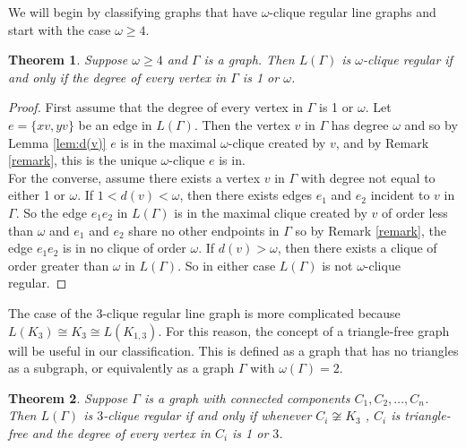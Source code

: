 \documentclass[12pt]{report}
\newtheorem{thm}{Theorem}[chapter]
\theoremstyle{definition}
\begin{document}
We will begin by classifying graphs that have $\omega$-clique regular line graphs and start with the case $\omega \geq 4$.
\begin{thm} \label{thm:4cr}
    Suppose $\omega \geq 4$ and $\Gamma$ is a graph. Then $L(\Gamma)$ is $\omega$-clique regular if and only if the degree of every vertex in $\Gamma$ is 1 or $\omega$.
\end{thm}
\begin{proof}
    First assume that the degree of every vertex in $\Gamma$ is 1 or $\omega$. Let $e=\{xv, yv\}$ be an edge in $L(\Gamma)$. Then the vertex $v$ in $\Gamma$ has degree $\omega$ and so by Lemma \ref{lem:d(v)} $e$ is in the maximal $\omega$-clique created by $v$, and by Remark \ref{remark}, this is the unique $\omega$-clique $e$ is in.\\
    For the converse, assume there exists a vertex $v$ in $\Gamma$ with degree not equal to either 1 or $\omega$. If $1 < d(v) < \omega$, then there exists edges $e_1$ and $e_2$ incident to $v$ in $\Gamma$. So the edge $e_1e_2$ in $L(\Gamma)$ is in the maximal clique created by $v$ of order less than $\omega$ and $e_1$ and $e_2$ share no other endpoints in $\Gamma$ so by Remark \ref{remark}, the edge $e_1e_2$ is in no clique of order $\omega$. If $d(v) > \omega $, then there exists a clique of order greater than $\omega$ in $L(\Gamma)$. So in either case $L(\Gamma)$ is not $\omega$-clique regular.
\end{proof}
The case of the $3$-clique regular line graph is more complicated because\linebreak $L(K_3) \cong K_3 \cong L(K_{1,3})$. For this reason, the concept of a triangle-free graph will be useful in our classification. This is defined as a graph that has no triangles as a subgraph, or equivalently as a graph $\Gamma$ with $\omega(\Gamma)=2$.
\begin{thm} \label{thm:3cr}
    Suppose $\Gamma$ is a graph with connected components $C_1, C_2, \ldots , C_n$. Then $L(\Gamma)$ is $3$-clique regular if and only if whenever $C_i \not \cong K_3$ , $C_i$ is triangle-free and the degree of every vertex in $C_i$ is 1 or $3$. 
\end{thm}
\end{document}
